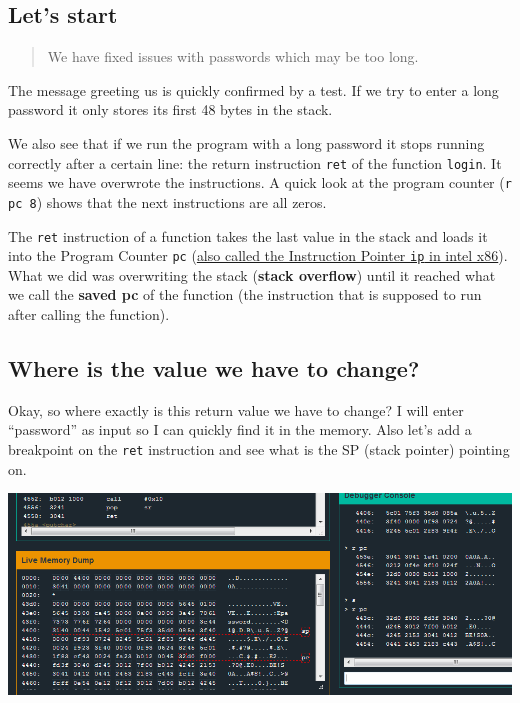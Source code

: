 \documentclass[a4paper,11pt]{article}
\begin{document}
\subsection{Let's start}\label{lets-start}

\begin{quote}
We have fixed issues with passwords which may be too long.
\end{quote}

The message greeting us is quickly confirmed by a test. If we try to
enter a long password it only stores its first 48 bytes in the stack.

We also see that if we run the program with a long password it stops
running correctly after a certain line: the return instruction
\texttt{ret} of the function \texttt{login}. It seems we have overwrote
the instructions. A quick look at the program counter (\texttt{r pc 8})
shows that the next instructions are all zeros.

The \texttt{ret} instruction of a function takes the last value in the
stack and loads it into the Program Counter \texttt{pc}
(\href{http://en.wikipedia.org/wiki/Program_counter}{also called the
Instruction Pointer \texttt{ip} in intel x86}).\\What we did was
overwriting the stack (\textbf{stack overflow}) until it reached what we
call the \textbf{saved pc} of the function (the instruction that is
supposed to run after calling the function).

\subsection{Where is the value we have to
change?}\label{where-is-the-value-we-have-to-change}

Okay, so where exactly is this return value we have to change? I will
enter ``password'' as input so I can quickly find it in the memory. Also
let's add a breakpoint on the \texttt{ret} instruction and see what is
the SP (stack pointer) pointing on.

\includegraphics{img/5_2.PNG}
\end{document}
